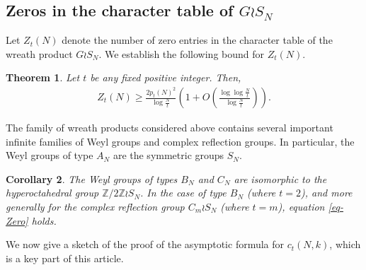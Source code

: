 \documentclass[11pt]{amsart}
\theoremstyle{plain}
\newtheorem{theorem}{Theorem}[section]
\newtheorem{corollary}[theorem]{Corollary}
\numberwithin{equation}{section}
\begin{document}
	\subsection{Zeros in the character table of \texorpdfstring{$G\wr S_N$}{G wr S\_N}}
	Let $Z_t(N)$ denote the number of zero entries in the character table of the wreath product $G \wr S_N$. We establish the following bound for $Z_t(N)$.
	\begin{theorem}\label{thm-ztNm}
		Let $t$ be any fixed positive integer. Then,
		\begin{align}\label{eq-Zero}
			Z_t(N)\ge \frac{2p_t(N)^{2}}{\log \frac{N}{t}}\left(1+O\left(\frac{\log \log \frac{N}{t}}{\log \frac{N}{t}}\right)\right).   
		\end{align}
	\end{theorem}
	The family of wreath products considered above contains several important infinite families of Weyl groups and complex reflection groups. In particular, the Weyl groups of type $A_N$ are the symmetric groups $S_N$.
	\begin{corollary}
		The Weyl groups of types $B_N$ and $C_N$ are isomorphic to the hyperoctahedral group $\mathbb{Z}/2\mathbb{Z}\wr S_N$. In the case of type $B_N$ (where $t=2$), and more generally for the complex reflection group $C_m\wr S_N$ (where $t=m$), equation \eqref{eq-Zero} holds.
	\end{corollary}
	
	We now give a sketch of the proof of the asymptotic formula for $c_t(N,k)$, which is a key part of this article.
\end{document}
